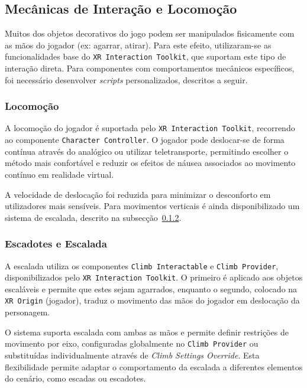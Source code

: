 \documentclass[a4paper, 12pt]{book}
\begin{document}
\subsection{Mecânicas de Interação e Locomoção}
\label{ssec:interacao-objetos}
Muitos dos objetos decorativos do jogo podem ser manipulados fisicamente com 
as mãos do jogador (ex: agarrar, atirar). Para este efeito, utilizaram-se as funcionalidades 
base do \texttt{XR Interaction Toolkit}, que suportam este tipo de interação direta. 
Para componentes com comportamentos mecânicos específicos, foi necessário desenvolver \textit{scripts} 
personalizados, descritos a seguir.

\subsubsection{Locomoção}\label{sssec:locomocao}

A locomoção do jogador é suportada pelo \texttt{XR Interaction Toolkit}, recorrendo ao componente
\texttt{Character Controller}. O jogador pode deslocar-se de forma contínua através do analógico
ou utilizar teletransporte, permitindo escolher o método mais confortável e reduzir os efeitos de
náusea associados ao movimento contínuo em realidade virtual.

A velocidade de deslocação foi reduzida para minimizar o desconforto em utilizadores mais
sensíveis. Para movimentos verticais é ainda disponibilizado um sistema de escalada,
descrito na subsecção~\ref{ssec:escada}.


\subsubsection{Escadotes e Escalada}
\label{ssec:escada}

A escalada utiliza os componentes \texttt{Climb Interactable} e \texttt{Climb Provider},
disponibilizados pelo \texttt{XR Interaction Toolkit}. O primeiro é aplicado aos objetos
escaláveis e permite que estes sejam agarrados, enquanto o segundo, colocado na
\texttt{XR Origin} (jogador), traduz o movimento das mãos do jogador em deslocação da personagem.

O sistema suporta escalada com ambas as mãos e permite definir restrições de movimento
por eixo, configuradas globalmente no \texttt{Climb Provider} ou substituídas
individualmente através de \textit{Climb Settings Override}. Esta flexibilidade permite adaptar o
comportamento da escalada a diferentes elementos do cenário, como escadas ou escadotes.
\end{document}
